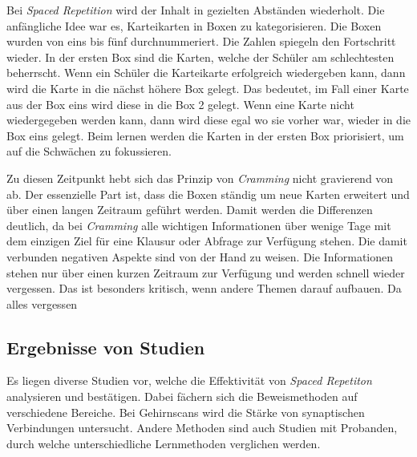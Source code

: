 Bei \textit{Spaced Repetition} wird der Inhalt in gezielten Abständen wiederholt. Die anfängliche Idee war es, Karteikarten in Boxen zu kategorisieren. Die Boxen wurden von eins bis fünf durchnummeriert. Die Zahlen spiegeln den Fortschritt wieder. In der ersten Box sind die Karten, welche der Schüler am schlechtesten beherrscht. Wenn ein Schüler die Karteikarte erfolgreich wiedergeben kann, dann wird die Karte in die nächst höhere Box gelegt. Das bedeutet, im Fall einer Karte aus der Box eins wird diese in die Box 2 gelegt. Wenn eine Karte nicht wiedergegeben werden kann, dann wird diese egal wo sie vorher war, wieder in die Box eins gelegt. Beim lernen werden die Karten in der ersten Box priorisiert, um auf die Schwächen zu fokussieren. \par
Zu diesen Zeitpunkt hebt sich das Prinzip von \textit{Cramming} nicht gravierend von ab. Der essenzielle Part ist, dass die Boxen ständig um neue Karten erweitert und über einen langen Zeitraum geführt werden. Damit werden die Differenzen deutlich, da bei \textit{Cramming} alle wichtigen Informationen über wenige Tage mit dem einzigen Ziel für eine Klausur oder Abfrage zur Verfügung stehen. Die damit verbunden negativen Aspekte sind von der Hand zu weisen. Die Informationen stehen nur über einen kurzen Zeitraum zur Verfügung und werden schnell wieder vergessen. Das ist besonders kritisch, wenn andere Themen darauf aufbauen. Da alles vergessen

\subsection{Ergebnisse von Studien}
Es liegen diverse Studien vor, welche die Effektivität von \textit{Spaced Repetiton} analysieren und bestätigen. Dabei fächern sich die Beweismethoden auf verschiedene Bereiche. Bei Gehirnscans wird die Stärke von synaptischen Verbindungen untersucht. Andere Methoden sind auch Studien mit Probanden, durch welche unterschiedliche Lernmethoden verglichen werden.


